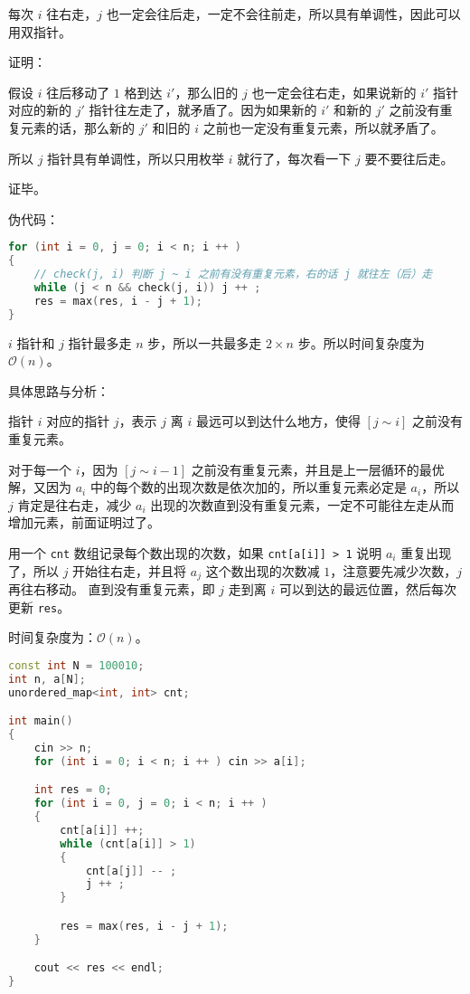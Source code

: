 每次 $i$ 往右走，$j$ 也一定会往后走，一定不会往前走，所以具有单调性，因此可以用双指针。

证明：

假设 $i$ 往后移动了 $1$ 格到达 $i'$，那么旧的 $j$ 也一定会往右走，如果说新的 $i'$ 指针对应的新的 $j'$ 指针往左走了，就矛盾了。因为如果新的 $i'$ 和新的 $j'$ 之前没有重复元素的话，那么新的 $j'$ 和旧的 $i$ 之前也一定没有重复元素，所以就矛盾了。

所以 $j$ 指针具有单调性，所以只用枚举 $i$ 就行了，每次看一下 $j$ 要不要往后走。

证毕。

伪代码：

\begin{lstlisting}[language=cpp]
for (int i = 0, j = 0; i < n; i ++ )
{
    // check(j, i) 判断 j ~ i 之前有没有重复元素，右的话 j 就往左（后）走
    while (j < n && check(j, i)) j ++ ;    
    res = max(res, i - j + 1);
}
\end{lstlisting}

$i$ 指针和 $j$ 指针最多走 $n$ 步，所以一共最多走 $2 \times n$ 步。所以时间复杂度为 $\mathcal{O}(n)$。

具体思路与分析：

指针 $i$ 对应的指针 $j$，表示 $j$ 离 $i$ 最远可以到达什么地方，使得 $[j \sim i]$ 之前没有重复元素。

对于每一个 $i$，因为 $[j \sim i - 1]$ 之前没有重复元素，并且是上一层循环的最优解，又因为 $a_i$ 中的每个数的出现次数是依次加的，所以重复元素必定是 $a_i$，所以 $j$ 肯定是往右走，减少 $a_i$ 出现的次数直到没有重复元素，一定不可能往左走从而增加元素，前面证明过了。

用一个 \verb|cnt| 数组记录每个数出现的次数，如果 \verb|cnt[a[i]] > 1| 说明 $a_i$ 重复出现了，所以 $j$ 开始往右走，并且将 $a_j$ 这个数出现的次数减 $1$，注意要先减少次数，$j$ 再往右移动。 直到没有重复元素，即 $j$ 走到离 $i$ 可以到达的最远位置，然后每次更新 \verb|res|。

时间复杂度为：$\mathcal{O}(n)$。

\begin{lstlisting}[language=cpp]
const int N = 100010;
int n, a[N];
unordered_map<int, int> cnt;

int main() 
{
    cin >> n;
    for (int i = 0; i < n; i ++ ) cin >> a[i];

    int res = 0;
    for (int i = 0, j = 0; i < n; i ++ )
    {
        cnt[a[i]] ++;
        while (cnt[a[i]] > 1)
        {
            cnt[a[j]] -- ;
            j ++ ;
        }

        res = max(res, i - j + 1);
    }

    cout << res << endl;
}
\end{lstlisting}

